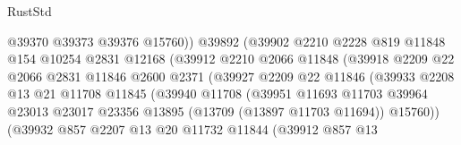 \begin{lexlean}{RustStd}
\begin{coremodule}
                                  @39370
                                  @39373
                                  @39376
                                  @15760))
                              @39892
                              (@39902
                                @2210
                                @2228
                                @819
                                @11848
                                @154
                                @10254
                                @2831
                                @12168
                                (@39912
                                  @2210
                                  @2066
                                  @11848
                                  (@39918
                                    @2209
                                    @22
                                    @2066
                                    @2831
                                    @11846
                                    @2600
                                    @2371
                                    (@39927
                                      @2209
                                      @22
                                      @11846
                                      (@39933
                                        @2208
                                        @13
                                        @21
                                        @11708
                                        @11845
                                        (@39940
                                          @11708
                                          (@39951
                                            @11693
                                            @11703
                                            @39964
                                            @23013
                                            @23017
                                            @23356
                                            @13895
                                            (@13709 (@13897 @11703 @11694))
                                            @15760))
                                        (@39932
                                          @857
                                          @2207
                                          @13
                                          @20
                                          @11732
                                          @11844
                                          (@39912
                                            @857
                                            @13

\end{coremodule}
\end{lexlean}

